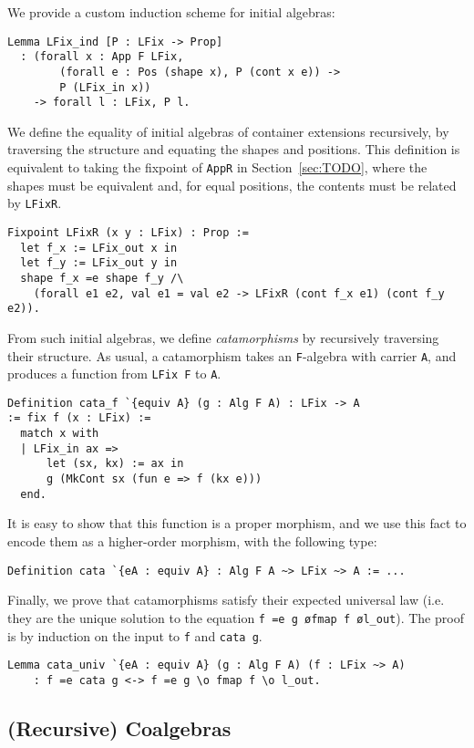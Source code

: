 \documentclass[a4paper, UKenglish, cleveref, autoref, thm-restate]{lipics-v2021}
\begin{document}
We provide a custom induction scheme for initial algebras:
\begin{verbatim}
Lemma LFix_ind [P : LFix -> Prop]
  : (forall x : App F LFix,
        (forall e : Pos (shape x), P (cont x e)) ->
        P (LFix_in x))
    -> forall l : LFix, P l.
\end{verbatim}
We define the equality of initial algebras of container extensions recursively,
by traversing the structure and equating the shapes and positions. This
definition is equivalent to taking the fixpoint of \texttt{AppR} in
Section~\ref{sec:TODO}, where the shapes must be equivalent and, for equal
positions, the contents must be related by \texttt{LFixR}.
\begin{verbatim}
Fixpoint LFixR (x y : LFix) : Prop :=
  let f_x := LFix_out x in
  let f_y := LFix_out y in
  shape f_x =e shape f_y /\
    (forall e1 e2, val e1 = val e2 -> LFixR (cont f_x e1) (cont f_y e2)).
\end{verbatim}
From such initial algebras, we define \emph{catamorphisms} by recursively
traversing their structure. As usual, a catamorphism takes an
\texttt{F}-algebra with carrier \texttt{A}, and produces a
function from \texttt{LFix F} to \texttt{A}.
\begin{verbatim}
Definition cata_f `{equiv A} (g : Alg F A) : LFix -> A
:= fix f (x : LFix) :=
  match x with
  | LFix_in ax =>
      let (sx, kx) := ax in
      g (MkCont sx (fun e => f (kx e)))
  end.
\end{verbatim}
It is easy to show that this function is a proper morphism, and we use this
fact to encode them as a higher-order morphism, with the following type:
\begin{verbatim}
Definition cata `{eA : equiv A} : Alg F A ~> LFix ~> A := ...
\end{verbatim}
Finally, we prove that catamorphisms satisfy their expected universal law (i.e.
they are the unique solution to the equation \texttt{f =e g \o fmap f \o l_out}).
The proof is by induction on the input to \texttt{f} and
\texttt{cata g}.
\begin{verbatim}
Lemma cata_univ `{eA : equiv A} (g : Alg F A) (f : LFix ~> A)
    : f =e cata g <-> f =e g \o fmap f \o l_out.
\end{verbatim}

\subsection{(Recursive) Coalgebras}
\end{document}
